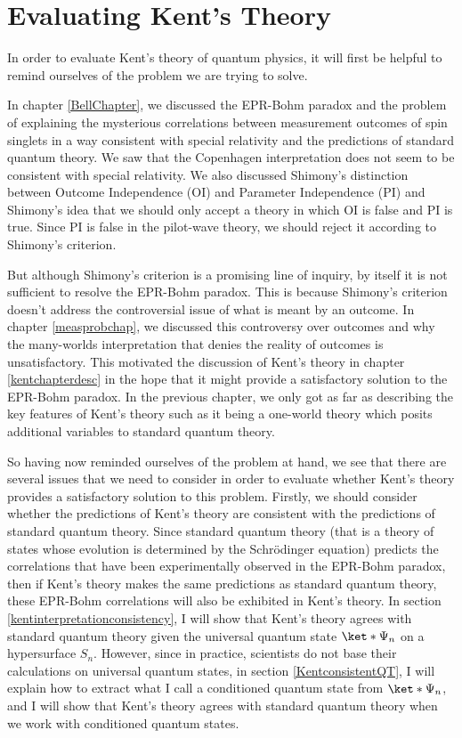 \documentclass[12pt]{report}
\begin{document}

\newpage 

\chapter{Evaluating Kent's Theory\label{KentEval}}
In order to evaluate Kent's theory of quantum physics, it will first be helpful to remind ourselves of the problem we are trying to solve. 

In chapter \ref{BellChapter}, we discussed the EPR-Bohm paradox and the problem of explaining  the mysterious correlations between measurement outcomes of spin singlets in a way consistent with special relativity and the predictions of standard quantum theory. We saw that the Copenhagen interpretation does not seem to be consistent with special relativity. We also discussed Shimony's distinction between Outcome Independence (OI) and Parameter Independence (PI) and Shimony's idea that we should only accept a theory in which OI is false and PI is true. Since PI is false in the pilot-wave theory, we should reject it according to Shimony's criterion.  

But although Shimony's criterion is a promising line of inquiry, by itself it is not sufficient to resolve the  EPR-Bohm paradox. This is because Shimony's criterion doesn't address the controversial issue of what is meant by an outcome. In chapter \ref{measprobchap}, we discussed this controversy over outcomes and why the many-worlds interpretation that denies the reality of outcomes is unsatisfactory. This motivated the discussion of Kent's theory in chapter \ref{kentchapterdesc} in the hope that it might provide a satisfactory solution to the EPR-Bohm paradox. In the previous chapter, we only got as far as describing the key features of Kent's theory such as it being a one-world theory which posits additional variables to standard quantum theory. 

So having now reminded ourselves of the problem at hand, we see that there are several issues that we need to consider in order to evaluate whether Kent's theory provides a satisfactory solution to this problem. Firstly, we should consider whether the predictions of Kent's theory are consistent with the  predictions of standard quantum theory. Since standard quantum theory (that is a theory of states whose evolution is determined by the Schr\"{o}dinger equation) predicts the correlations that have been experimentally observed in the EPR-Bohm paradox, then if Kent's theory makes the same predictions as standard quantum theory, these EPR-Bohm correlations will also be exhibited in Kent's theory.  In section \ref{kentinterpretationconsistency}, I will show that Kent's theory agrees with standard quantum theory given the universal quantum state $\ket*{\Psi_n}$ on a hypersurface $S_n$. However, since in practice, scientists do not base their calculations on universal quantum states, in section \ref{KentconsistentQT}, I will explain how to extract what I call a conditioned quantum state from $\ket*{\Psi_n}$, and I will show that  Kent's theory agrees with standard quantum theory when we work with conditioned quantum states.
\end{document}
